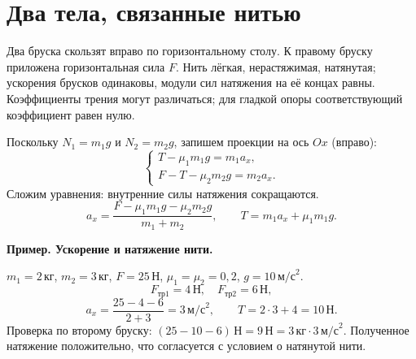 \documentclass[a4paper,12pt]{article}
\newcommand{\unit}[1]{\,\text{#1}}
\newcommand{\example}[1]{\par\medskip\textcolor{darkaccent}{\textbf{#1}}\par}
\begin{document}
\section{Два тела, связанные нитью}
Два бруска скользят вправо по горизонтальному столу. К правому бруску приложена горизонтальная сила $F$. Нить лёгкая, нерастяжимая, натянутая; ускорения брусков одинаковы, модули сил натяжения на её концах равны. Коэффициенты трения могут различаться; для гладкой опоры соответствующий коэффициент равен нулю.
\begin{center}
\end{center}
Поскольку $N_1=m_1g$ и $N_2=m_2g$, запишем проекции на ось $Ox$ (вправо):
\[\begin{cases} T-\mu_1m_1g=m_1a_x,\\ F-T-\mu_2m_2g=m_2a_x.\end{cases}\]
Сложим уравнения: внутренние силы натяжения сокращаются.
\[a_x=\frac{F-\mu_1m_1g-\mu_2m_2g}{m_1+m_2},\qquad T=m_1a_x+\mu_1m_1g.\]
\example{Пример. Ускорение и натяжение нити.}
$m_1=2\unit{кг}$, $m_2=3\unit{кг}$, $F=25\unit{Н}$, $\mu_1=\mu_2=0,2$, $g=10\unit{м/с}^2$.
\[F_{\text{тр}1}=4\unit{Н},\quad F_{\text{тр}2}=6\unit{Н},\]
\[a_x=\frac{25-4-6}{2+3}=3\unit{м/с}^2,\qquad T=2\cdot3+4=10\unit{Н}.\]
Проверка по второму бруску: $(25-10-6)\unit{Н}=9\unit{Н}=3\unit{кг}\cdot3\unit{м/с}^2$. Полученное натяжение положительно, что согласуется с условием о натянутой нити.
\clearpage
\end{document}
